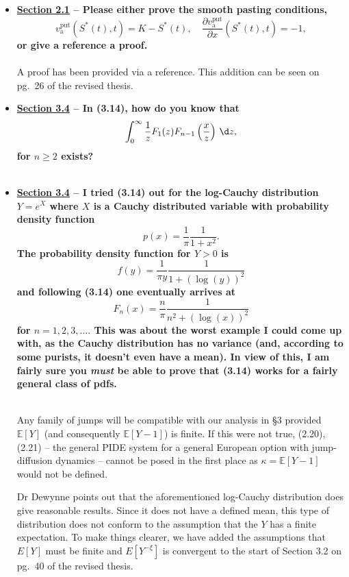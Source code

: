 \documentclass{article}
\begin{document}
\begin{enumerate}
\begin{itemize}
		\item \textbf{ \underline{Section 2.1} -- Please either prove the smooth pasting conditions,
			$$
				v_\text{a}^\text{put}(S^*(t),t) = K - S^*(t), \quad \frac{\partial v_\text{a}^\text{put}}{\partial x}(S^*(t),t) = -1,
			$$
			or give a reference a proof.\\ \\}
			A proof has been provided via a reference. This addition can be seen on pg.~26 of the revised thesis.
			
		\item \textbf{\underline{Section 3.4} -- In (3.14), how do you know that
			$$
				\int_0^\infty \frac{1}{z}F_1(z)F_{n-1}\left(\frac{x}{z}\right) \, \d z,
			$$
		for $n \geq 2$ exists? \\ \\}
		
		\item \textbf{\underline{Section 3.4} -- I tried (3.14) out for the log-Cauchy distribution $Y = e^X$ where $X$ is a Cauchy distributed variable with probability density function
		$$
			p(x) = \frac{1}{\pi}\frac{1}{1+x^2}.
		$$
		The probability density function for $Y > 0$ is
		$$
			f(y) = \frac{1}{\pi y}\frac{1}{1 + (\log(y))^2}
		$$
		and following (3.14) one eventually arrives at
		$$
			F_n(x) = \frac{n}{\pi} \frac{1}{n^2 + (\log(x))^2}
		$$
		for $n = 1,2,3, \ldots.$ This was about the worst example I could come up with, as the Cauchy distribution has no variance (and, according to some purists, it doesn't even have a mean). In view of this, I am fairly sure you \emph{must} be able to prove that (3.14) works for a fairly general class of pdfs.\\ \\}
		
		Any family of jumps will be compatible with our analysis in \S3 provided $\mathbb{E}[Y]$ (and consequently $\mathbb{E}[Y-1]$) is finite. If this were not true, (2.20), (2.21) -- the general PIDE system for a general European option with jump-diffusion dynamics -- cannot be posed in the first place as $\kappa = \mathbb{E}[Y-1]$ would not be defined. 
	
	Dr Dewynne points out that the aforementioned log-Cauchy distribution does give reasonable results. Since it does not have a defined mean, this type of distribution does not conform to the assumption that the $Y$ has a finite expectation. To make things clearer, we have added the assumptions that $E[Y]$ must be finite and $E[Y^{-\xi}]$ is convergent to the start of Section 3.2 on pg.~40 of the revised thesis.
					\end{itemize}
\end{enumerate}
\end{document}
